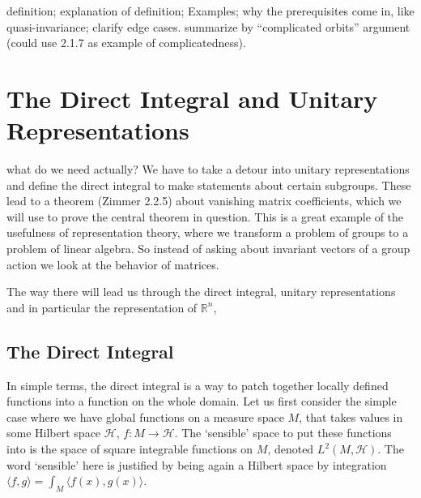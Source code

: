 \documentclass[
]{article}
\begin{document}
definition; explanation of definition; Examples; why the prerequisites
come in, like quasi-invariance; clarify edge cases. summarize by
``complicated orbits'' argument (could use 2.1.7 as example of
complicatedness).






\hypertarget{the-direct-integral-and-unitary-representations}{%
\section{The Direct Integral and Unitary Representations}\label{the-direct-integral-and-unitary-representations}}

what do we need actually? We have to take a detour into unitary
representations and define the direct integral to make statements about
certain subgroups. These lead to a theorem (Zimmer 2.2.5) about
vanishing matrix coefficients, which we will use to prove the central
theorem in question. This is a great example of the usefulness of
representation theory, where we transform a problem of groups to a
problem of linear algebra. So instead of asking about invariant vectors
of a group action we look at the behavior of matrices.

The way there will lead us through the direct integral, unitary
representations and in particular the representation of
\(\mathbb{R}^n\), 

\hypertarget{the-direct-integral}{%
\subsection{The Direct Integral}\label{the-direct-integral}}

In simple terms, the direct integral is a way to patch together locally
defined functions into a function on the whole domain. Let us first
consider the simple case where we have global functions on a measure
space \(M\), that takes values in some Hilbert space \(\mathscr{H}\),
\(f:M \rightarrow \mathscr{H}\). The `sensible' space to put these
functions into is the space of square integrable functions on \(M\),
denoted \(L^2(M, \mathscr{H})\). The word `sensible' here is justified
by being again a Hilbert space by integration
\(\langle f, g\rangle = \int_M\langle f(x), g(x)\rangle\).

\end{document}
